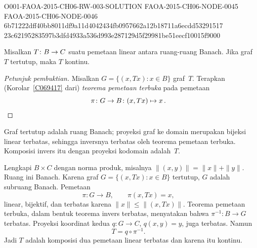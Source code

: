 \begin{o001readerwork}
  {O001-FAOA-2015-CH06-RW-003-SOLUTION}
  {FAOA-2015-CH06-NODE-0045}
  {FAOA-2015-CH06-NODE-0046}
  {6b71222dff40bb8011df9a11d4042434fb0957662a12b18711a6ecdd53291517}
  {23c62195283597b3dfd4933a536d993e287129d5f29981be51eecf10015f9000}
\begin{o001result}
\begin{thm}\label{thm_CGT} Misalkan $T\colon B \rightarrow C$ suatu pemetaan linear antara ruang-ruang Banach.
Jika graf $T$ tertutup, maka $T$ kontinu.
\end{thm}
\end{o001result}
\begin{o001sourcehint}
\begin{proof}[\emph{Petunjuk pembuktian}] Misalkan $G = \{(x,Tx)\colon x \in B\}$ graf~$T$. Terapkan
(Korolar~\ref{C069417} dari) \emph{teorema pemetaan terbuka} pada pemetaan
  \[ \pi\colon G \rightarrow B\colon (x,Tx) \mapsto x\,. \]
\ns \end{proof}
\end{o001sourcehint}
\begin{o001answer}
Graf tertutup adalah ruang Banach; proyeksi graf ke domain merupakan bijeksi
linear terbatas, sehingga inversnya terbatas oleh teorema pemetaan terbuka.
Komposisi invers itu dengan proyeksi kodomain adalah~$T$.
\end{o001answer}
\begin{o001proof}
Lengkapi $B\times C$ dengan norma produk, misalnya
$\|(x,y)\|=\|x\|+\|y\|$. Ruang ini Banach. Karena graf
$G=\{(x,Tx):x\in B\}$ tertutup, $G$ adalah subruang Banach. Pemetaan
\[
 \pi\colon G\to B,
 \qquad
 \pi(x,Tx)=x,
\]
linear, bijektif, dan terbatas karena $\|x\|\leq\|(x,Tx)\|$. Teorema pemetaan
terbuka, dalam bentuk teorema invers terbatas, menyatakan bahwa
$\pi^{-1}\colon B\to G$ terbatas. Proyeksi koordinat kedua
$q\colon G\to C$, $q(x,y)=y$, juga terbatas. Namun
\[
 T=q\circ\pi^{-1}.
\]
Jadi $T$ adalah komposisi dua pemetaan linear terbatas dan karena itu kontinu.
\end{o001proof}
\end{o001readerwork}

